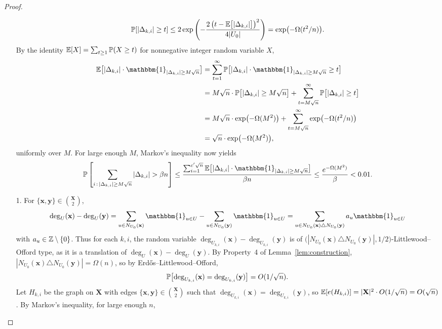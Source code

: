 \begin{proof}
\begin{enumerate}
    \[
      \prob[|\Delta_{k, i}| \geq t] \leq 2\exp\left(-\frac{2\left(t - \E\bigl[|\Delta_{k, i}|\bigr]\right)^2}{4|U_0|}\right) = \exp\bigl(-\Omega(t^2/n)\bigr).
    \]
    By the identity $\E[X] = \sum_{t \geq 1} \prob(X \geq t)$ for nonnegative integer random variable $X$, 
    \begin{align*}
      \E\bigl[|\Delta_{k, i}| \cdot \mathbbm{1}_{|\Delta_{k, i}| \geq M\sqrt{n}}\bigr]
      &= \sum_{t = 1}^{\infty} \prob\bigl[|\Delta_{k, i}| \cdot \mathbbm{1}_{|\Delta_{k, i}| \geq M\sqrt{n}} \geq t\bigr] \\
      &= M\sqrt{n} \cdot \prob\bigl[|\Delta_{k, i}| \geq M\sqrt{n}\bigr] + \sum_{t = M\sqrt{n}}^{\infty} \prob\bigl[|\Delta_{k, i}| \geq t\bigr] \\
      &= M\sqrt{n} \cdot \exp\bigl(-\Omega(M^2)\bigr) + \sum_{t = M\sqrt{n}}^{\infty} \exp\bigl(-\Omega(t^2/n)\bigr) \\
      &= \sqrt{n} \cdot \exp\bigl(-\Omega(M^2)\bigr),
    \end{align*}
    uniformly over $M$. For large enough $M$, Markov's inequality now yields
    \[
     \prob\left[\sum_{\substack{i \,:\, |\Delta_{k,i}| \geq M\sqrt{n}}} |\Delta_{k,i}| > \beta n\right] \leq \frac{\sum_{i = 1}^{c'\sqrt{n}} \E\bigl[|\Delta_{k, i}| \cdot \mathbbm{1}_{|\Delta_{k, i}| \geq M\sqrt{n}}\bigr]}{\beta n} \leq \frac{e^{-\Omega(M^2)}}{\beta} < 0.01.
    \]
    \item[1.] For $\{\mathbf{x}, \mathbf{y}\} \in \binom{\mathbf{X}}{2}$, 
    \[
      \deg_{U}(\mathbf{x}) - \deg_{U}(\mathbf{y}) = \sum_{u \in N_{U_0}(\mathbf{x})} \mathbbm{1}_{u \in U} - \sum_{u \in N_{U_0}(\mathbf{y})} \mathbbm{1}_{u \in U} = \sum_{u \in N_{U_0}(\mathbf{x}) \triangle N_{U_0}(\mathbf{y})} a_u \mathbbm{1}_{u \in U}
    \]
    with $a_u \in \mathbb{Z} \setminus \{0\}$. Thus for each $k, i$, the random variable $\deg_{U_{k, i}}(\mathbf{x}) - \deg_{U_{k, i}}(\mathbf{y})$ is of $\bigl(|N_{U_0}(\mathbf{x}) \triangle N_{U_0}(\mathbf{y})|, 1/2\bigr)$-Littlewood--Offord type, as it is a translation of $\deg_{U}(\mathbf{x}) - \deg_{U}(\mathbf{y})$. By Property~4 of Lemma~\ref{lem:construction}, $|N_{U_0}(\mathbf{x}) \triangle N_{U_0}(\mathbf{y})| = \Omega(n)$, so by Erd\H{o}s--Littlewood--Offord,
    \[
      \mathbb{P}\bigl[\operatorname{deg}_{U_{k, i}}(\mathbf{x}) = \operatorname{deg}_{U_{k, i}}(\mathbf{y})\bigr] = O(1/\sqrt{n}).
    \]
    Let $H_{k, i}$ be the graph on $\mathbf{X}$ with edges $\{\mathbf{x}, \mathbf{y}\} \in \binom{\mathbf{X}}{2}$ such that $\deg_{U_{k, i}}(\mathbf{x}) = \deg_{U_{k, i}}(\mathbf{y})$, so $\mathbb{E}[e(H_{k, i})] = |\mathbf{X}|^2 \cdot O(1/\sqrt{n}) = O(\sqrt{n})$. By Markov's inequality, for large enough $n$,

\end{enumerate}
\end{proof}

